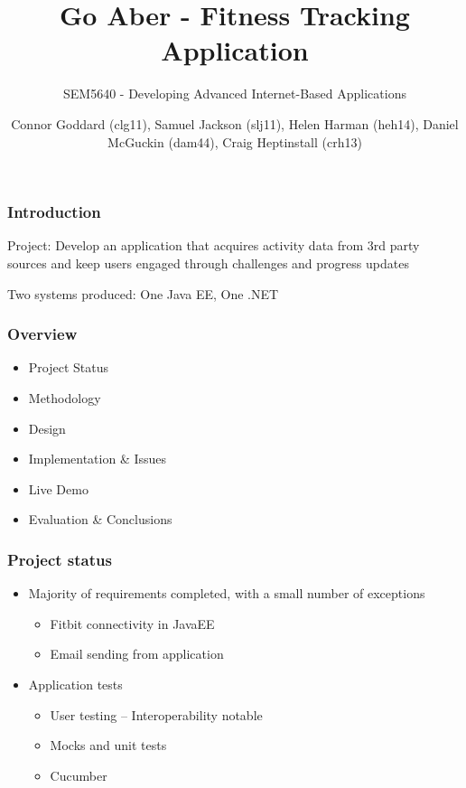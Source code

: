 \documentclass[10pt, compress]{beamer}
\title{Go Aber - Fitness Tracking Application}
\subtitle{\small{SEM5640 - Developing Advanced Internet-Based Applications}}
\author{\footnotesize{Connor Goddard (clg11), Samuel Jackson (slj11), Helen Harman (heh14), Daniel McGuckin (dam44), Craig Heptinstall (crh13)}}
\institute{Aberystwyth University}
\begin{document}
\maketitle

\begin{frame}[fragile]
  \frametitle{Introduction}
  
  \small {
  
    Project: Develop an application that acquires activity data from 3rd party sources and keep users engaged through challenges and progress updates
    
    \vspace{10pt}
    
    Two systems produced: One Java EE, One .NET
    
    }

\end{frame}

\begin{frame}[fragile]
  \frametitle{Overview}
  
  \small{
  
  	\begin{itemize}
    	\item Project Status
    	\item Methodology
    	\item Design
    	\item Implementation \& Issues
    	\item Live Demo
    	\item Evaluation \& Conclusions
    \end{itemize}
    
    }

\end{frame}


\begin{frame}[fragile]
\frametitle{Project status}

\begin{itemize}
	\item Majority of requirements completed, with a small number of exceptions
		\begin{itemize}
			\item Fitbit connectivity in JavaEE
			\item Email sending from application
		\end{itemize}
	\item Application tests
		\begin{itemize}
			\item User testing – Interoperability notable
			\item Mocks and unit tests
			\item Cucumber
		\end{itemize}
\end{itemize}
\end{frame}
\end{document}
